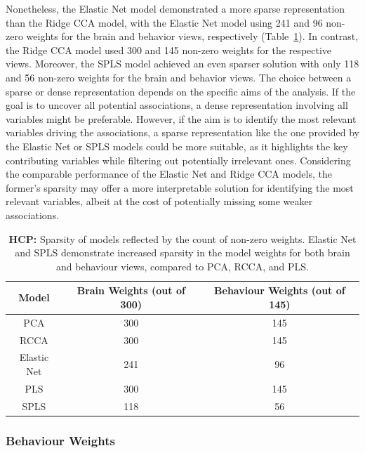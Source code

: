 Nonetheless, the Elastic Net model demonstrated a more sparse representation than the Ridge CCA model, with the Elastic Net model using 241 and 96 non-zero weights for the brain and behavior views, respectively (Table~\ref{tab:sparse-weights-hcp}). In contrast, the Ridge CCA model used 300 and 145 non-zero weights for the respective views. Moreover, the SPLS model achieved an even sparser solution with only 118 and 56 non-zero weights for the brain and behavior views. The choice between a sparse or dense representation depends on the specific aims of the analysis. If the goal is to uncover all potential associations, a dense representation involving all variables might be preferable. However, if the aim is to identify the most relevant variables driving the associations, a sparse representation like the one provided by the Elastic Net or SPLS models could be more suitable, as it highlights the key contributing variables while filtering out potentially irrelevant ones. Considering the comparable performance of the Elastic Net and Ridge CCA models, the former's sparsity may offer a more interpretable solution for identifying the most relevant variables, albeit at the cost of potentially missing some weaker associations.

\begin{table}[h]
    \centering
    \caption{\textbf{HCP:} Sparsity of models reflected by the count of non-zero weights. Elastic Net and SPLS demonstrate increased sparsity in the model weights for both brain and behaviour views, compared to PCA, RCCA, and PLS.}
    \begin{tabular}{|c|c|c|}
        \hline
        Model       & Brain Weights (out of 300) & Behaviour Weights (out of 145) \\
        \hline
        PCA         & 300           & 145               \\
        RCCA        & 300           & 145               \\
        Elastic Net & 241           & 96                \\
        PLS         & 300           & 145               \\
        SPLS        & 118           & 56                \\
        \hline
    \end{tabular}\label{tab:sparse-weights-hcp}
\end{table}

\subsubsection{Behaviour Weights}

